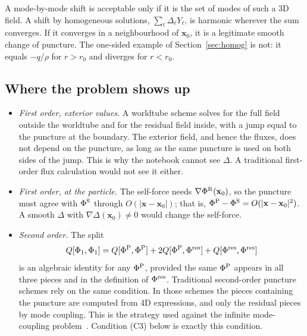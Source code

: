 \documentclass[11pt,a4paper]{article}
\newcommand{\PhiS}{\Phi^{\rm S}}
\newcommand{\PhiR}{\Phi^{\rm R}}
\newcommand{\x}{\mathbf{x}}
\begin{document}
A mode-by-mode shift is acceptable only if it is the set of modes of such a 3D field.
A shift by homogeneous solutions, $\sum_\ell\Delta_\ell Y_\ell$, is harmonic wherever the sum converges.
If it converges in a neighbourhood of $\x_0$, it is a legitimate smooth change of puncture.
The one-sided example of Section~\ref{sec:homog} is not: it equals $-q/\rho$ for $r>r_0$ and diverges for $r<r_0$.

\subsection{Where the problem shows up}
\begin{itemize}[nosep]
\item \emph{First order, exterior values.}
  A worldtube scheme solves for the full field outside the worldtube and for the residual field inside, with a jump equal to the puncture at the boundary.
  The exterior field, and hence the fluxes, does not depend on the puncture, as long as the same puncture is used on both sides of the jump.
  This is why the notebook cannot see $\Delta$.
  A traditional first-order flux calculation would not see it either.
\item \emph{First order, at the particle.}
  The self-force needs $\nabla\PhiR(\x_0)$, so the puncture must agree with $\PhiS$ through $O(|\x-\x_0|)$; that is, $\Phi^{\rm P}-\PhiS=O(|\x-\x_0|^2)$.
  A smooth $\Delta$ with $\nabla\Delta(\x_0)\neq0$ would change the self-force.
\item \emph{Second order.}
  The split
  \begin{equation}
  Q[\Phi_1,\Phi_1]=Q[\Phi^{\rm P},\Phi^{\rm P}]+2Q[\Phi^{\rm P},\Phi^{\rm res}]+Q[\Phi^{\rm res},\Phi^{\rm res}]
  \label{eq:splitP}
  \end{equation}
  is an algebraic identity for any $\Phi^{\rm P}$, provided the same $\Phi^{\rm P}$ appears in all three pieces and in the definition of $\Phi^{\rm res}$.
  Traditional second-order puncture schemes rely on the same condition.
  In those schemes the pieces containing the puncture are computed from 4D expressions, and only the residual pieces by mode coupling.
  This is the strategy used against the infinite mode-coupling problem~\cite{MillerWardellPound2016}.
  Condition (C3) below is exactly this condition.
\end{itemize}
\end{document}
